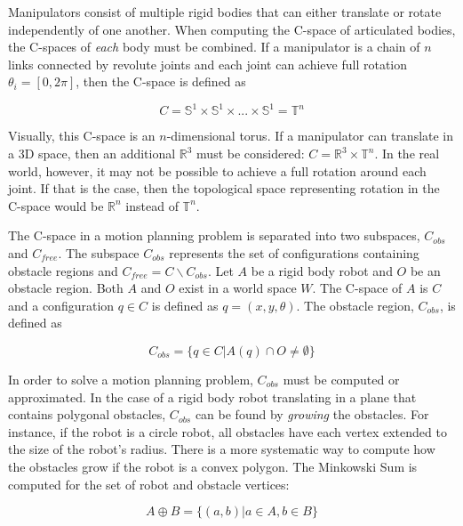 \documentclass[10pt,conference]{ieeeconf}
\begin{document}
    Manipulators consist of multiple rigid bodies that can either translate or rotate independently of one another. When computing the C-space of articulated bodies, the C-spaces of \emph{each} body must be combined. If a manipulator is a chain of $n$ links connected by revolute joints and each joint can achieve full rotation $\theta_i=[0, 2\pi]$, then the C-space is defined as
    
    \begin{equation}
    C = \mathbb{S}^1 \times \mathbb{S}^1 \times ... \times \mathbb{S}^1 = \mathbb{T}^n
    \end{equation}
   
    Visually, this C-space is an $n$-dimensional torus. If a manipulator can translate in a 3D space, then an additional $\mathbb{R}^3$ must be considered: $C=\mathbb{R}^3 \times \mathbb{T}^n$. In the real world, however, it may not be possible to achieve a full rotation around each joint. If that is the case, then the topological space representing rotation in the C-space would be $\mathbb{R}^n$ instead of $\mathbb{T}^n$. 
    
    The C-space in a motion planning problem is separated into two subspaces, $C_{obs}$ and $C_{free}$. The subspace $C_{obs}$ represents the set of configurations containing obstacle regions and $C_{free} = C \backslash C_{obs}$. Let $A$ be a rigid body robot and $O$ be an obstacle region. Both $A$ and $O$ exist in a world space $W$. The C-space of $A$ is $C$ and a configuration $q \in C$ is defined as $q=(x, y, \theta)$. The obstacle region, $C_{obs}$, is defined as
    
    \begin{equation}
    C_{obs} = \{q \in C | A(q) \cap O \neq \emptyset\}
    \end{equation}

In order to solve a motion planning problem, $C_{obs}$ must be computed or approximated. In the case of a rigid body robot translating in a plane that contains polygonal obstacles, $C_{obs}$ can be found by \emph{growing} the obstacles. For instance, if the robot is a circle robot, all obstacles have each vertex extended to the size of the robot's radius. There is a more systematic way to compute how the obstacles grow if the robot is a convex polygon. The Minkowski Sum is computed for the set of robot and obstacle vertices:

\begin{equation}
A \oplus B = \{(a,b) | a \in A, b \in B\}
\end{equation}
\end{document}
